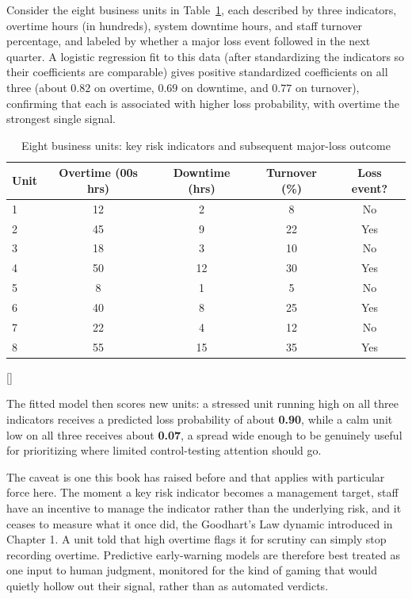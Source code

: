 \documentclass[../ai_in_finance]{subfiles}
\begin{document}
Consider the eight business units in Table~\ref{tab:oprisk-kri}, each described by three indicators, overtime hours (in hundreds), system downtime hours, and staff turnover percentage, and labeled by whether a major loss event followed in the next quarter. A logistic regression fit to this data (after standardizing the indicators so their coefficients are comparable) gives positive standardized coefficients on all three (about $0.82$ on overtime, $0.69$ on downtime, and $0.77$ on turnover), confirming that each is associated with higher loss probability, with overtime the strongest single signal.

\begin{table}[htbp]
\centering
\begin{lrbox}{\bookmeasuredbox}
\begin{tabular}{lcccc}
\toprule
Unit & Overtime (00s hrs) & Downtime (hrs) & Turnover (\%) & Loss event? \\
\midrule
1 & 12 & 2  & 8  & No \\
2 & 45 & 9  & 22 & Yes \\
3 & 18 & 3  & 10 & No \\
4 & 50 & 12 & 30 & Yes \\
5 & 8  & 1  & 5  & No \\
6 & 40 & 8  & 25 & Yes \\
7 & 22 & 4  & 12 & No \\
8 & 55 & 15 & 35 & Yes \\
\bottomrule
\end{tabular}
\end{lrbox}
\ifdim\wd\bookmeasuredbox<0.65\linewidth
\setlength{\bookcapwidth}{0.65\linewidth}
\else
\setlength{\bookcapwidth}{\wd\bookmeasuredbox}
\fi
{}[\bookcapwidth]{
\usebox{\bookmeasuredbox}
}{
\caption{Eight business units: key risk indicators and subsequent major-loss outcome}
\label{tab:oprisk-kri}
}
\end{table}

The fitted model then scores new units: a stressed unit running high on all three indicators receives a predicted loss probability of about \textbf{0.90}, while a calm unit low on all three receives about \textbf{0.07}, a spread wide enough to be genuinely useful for prioritizing where limited control-testing attention should go.

The caveat is one this book has raised before and that applies with particular force here. The moment a key risk indicator becomes a management target, staff have an incentive to manage the indicator rather than the underlying risk, and it ceases to measure what it once did, the Goodhart's Law dynamic introduced in Chapter 1. A unit told that high overtime flags it for scrutiny can simply stop recording overtime. Predictive early-warning models are therefore best treated as one input to human judgment, monitored for the kind of gaming that would quietly hollow out their signal, rather than as automated verdicts.
\end{document}
